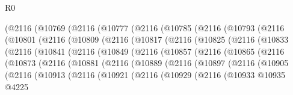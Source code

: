 \begin{lexlean}{R0}
\begin{coremodule}
      (@2116
        (@10769
          (@2116
            (@10777
              (@2116
                (@10785
                  (@2116
                    (@10793
                      (@2116
                        (@10801
                          (@2116
                            (@10809
                              (@2116
                                (@10817
                                  (@2116
                                    (@10825
                                      (@2116
                                        (@10833
                                          (@2116
                                            (@10841
                                              (@2116
                                                (@10849
                                                  (@2116
                                                    (@10857
                                                      (@2116
                                                        (@10865
                                                          (@2116
                                                            (@10873
                                                              (@2116
                                                                (@10881
                                                                  (@2116
                                                                    (@10889
                                                                      (@2116
                                                                        (@10897
                                                                          (@2116
                                                                            (@10905
                                                                              (@2116
                                                                                (@10913
                                                                                  (@2116
                                                                                    (@10921
                                                                                      (@2116
                                                                                        (@10929
                                                                                          (@2116
                                                                                            (@10933
                                                                                              @10935
                                                                                              @4225

\end{coremodule}
\end{lexlean}
